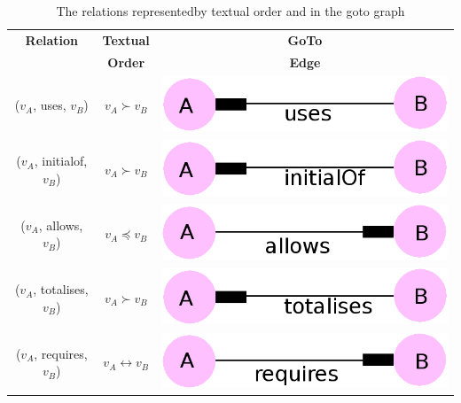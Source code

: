 \begin{table}[H]
\centering
\begin{tabular}{| c | c | c |}
\hline
\textbf{Relation} & \textbf{Textual} & \textbf{GoTo} \\
& \textbf{Order} & \textbf{Edge} \\
\hline
($v_{A}$, uses, $v_{B}$) & $v_{A} \succ v_{B}$ & \includegraphics[scale=0.15]{Figures/Formalising/uses.png} \\
\hline
($v_{A}$, initialof, $v_{B}$) & $v_{A} \succ v_{B}$  & \includegraphics[scale=0.15]{Figures/Formalising/initialof.png} \\
\hline
($v_{A}$, allows, $v_{B}$) & $v_{A} \preceq v_{B}$ & \includegraphics[scale=0.15]{Figures/Formalising/allows.png} \\
\hline
($v_{A}$, totalises, $v_{B}$) & $v_{A} \succ v_{B}$ & \includegraphics[scale=0.15]{Figures/Formalising/totalises.png} \\
\hline
($v_{A}$, requires, $v_{B}$) & $v_{A} \leftrightarrow v_{B}$ & \includegraphics[scale=0.15]{Figures/Formalising/requires.png} \\
\hline
\end{tabular}
\caption{The relations representedby textual order and in the goto graph \label{tab:gotorelations}}
\end{table}

